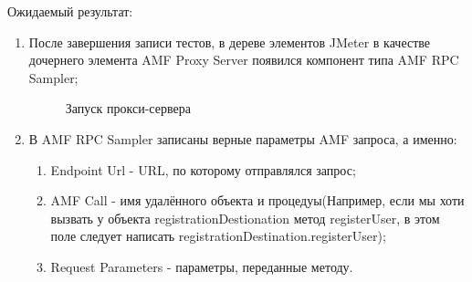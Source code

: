 Ожидаемый результат:

\begin{enumerate}
\item  После завершения записи тестов, в дереве элементов JMeter в качестве дочернего элемента AMF Proxy Server
появился компонент типа AMF RPC Sampler;

\begin{figure}[h]
\caption{Запуск прокси-сервера}
\label{ris:proxyStart.png}
\end{figure}

\item В AMF RPC Sampler записаны верные параметры AMF запроса, а именно:

\begin{enumerate}
\item Endpoint Url - URL, по которому отправлялся запрос;
\item AMF Call - имя удалённого объекта и процедуы(Например, если мы хоти вызвать у объекта registrationDestionation метод registerUser,
в этом поле следует написать registrationDestination.registerUser);
\item Request Parameters - параметры, переданные методу.
\end{enumerate}


\end{enumerate}
